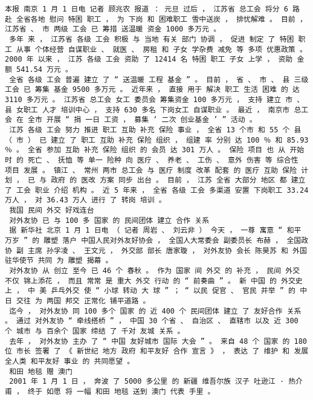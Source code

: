 \documentclass{article}
\begin{document}
\begin{Verbatim}[commandchars=\\\{\}]
 本报 南京 1 月 1 日电 记者 顾兆农 报道 ： 元旦 过后 ， 江苏省 总工会 将分 6 路 赴 全省各地 慰问 特困 职工 ， 为 下岗 和 困难职工 雪中送炭 ， 排忧解难 。 目前 ， 江苏省 、 市 两级 工会 已 筹措 送温暖 资金 1000 多万元 。 
 多年 来 ， 江苏省 各级 工会 积极 与 当地 有关 部门 协调 ， 促进 制定 了 特困 职工 从事 个体经营 自谋职业 、 就医 、 房租 和 子女 学杂费 减免 等 多项 优惠政策 。 2000 年 以来 ， 江苏 各级 工会 资助 了 12414 名 特困 职工 子女 上学 ， 资助 金额 541.54 万元 。 
 全省 各级 工会 普遍 建立 了 “ 送温暖 工程 基金 ” 。 目前 ， 省 、 市 、 县 三级 工会 已 筹集 基金 9500 多万元 。 近年来 ， 直接 用于 解决 职工 生活 困难 的 达 3110 多万元 。 江苏省 总工会 女工 委员会 筹集资金 100 多万元 ， 支持 建立 市 、 县 女职工 人才 培训中心 ， 支持 630 多名 下岗女工 自谋职业 。 最近 ， 南京市 总工会 在 全市 开展 “ 捐 一日 工资 ， 募集 ‘ 二次 创业基金 ’ ” 活动 。 
 江苏 各级 工会 努力 推进 职工 互助 补充 保险 事业 ， 全省 13 个市 和 55 个 县 （ 市 ） 已 建立 了 职工 互助 补充 保险 组织 ， 组建 率 分别 达 100 ％ 和 85.93 ％ 。 全省 参加 互助 补充 保险 组织 的 会员 达 301 万人 。 保险 项目 也 从 开始 时 的 死亡 、 抚恤 等 单一 险种 向 医疗 、 养老 、 工伤 、 意外 伤害 等 综合性 项目 发展 。 镇江 、 常州 两市 总工会 与 医疗 制度 改革 配套 的 医疗 互助 保险 计划 ， 已 与 政府 的 医改 方案 同步 出台 。 目前 ， 江苏 全省 大部分 地区 都 建立 了 工会 职业 介绍 机构 。 近 5 年来 ， 全省 各级 工会 多渠道 安置 下岗职工 33.24 万人 ， 对 36.43 万人 进行 了 转岗 培训 。 
 我国 民间 外交 好戏连台 
 对外友协 已 与 100 多 国家 的 民间团体 建立 合作 关系 
 据 新华社 北京 1 月 1 日电 （ 记者 周岩 、 刘云非 ） 今天 ， 一尊 寓意 “ 和平 万岁 ” 的 雕塑 落户 中国人民对外友好协会 ， 全国人大常委会 副委员长 布赫 ， 全国政协 副 主席 孙孚凌 、 王文元 ， 外交部 部长 唐家璇 ， 对外友协 会长 陈昊苏 和 外国 驻华使节 共同 为 雕塑 揭幕 。 
 对外友协 从 创立 至今 已 46 个 春秋 。 作为 国家 间 外交 的 补充 ， 民间 外交 不仅 锦上添花 ， 而且 常常 是 重大 外交 行动 的 “ 前奏曲 ” 。 新 中国 的 外交史 上 ， 中 美 乒乓外交 使 “ 小球 转动 大 球 ” ； “ 以民 促官 、 官民 并举 ” 的 中日 交往 为 两国 邦交 正常化 铺平道路 。 
 迄今 ， 对外友协 同 100 多个 国家 的 近 400 个 民间团体 建立 了 友好合作 关系 。 通过 对外友协 “ 牵线搭桥 ” ， 中国 30 个省 、 自治区 、 直辖市 以及 近 300 个 城市 与 百余个 国家 缔结 了 千对 友城 关系 。 
 去年 ， 对外友协 主办 了 “ 中国 友好城市 国际 大会 ” 。 来自 48 个 国家 的 180 位 市长 签署 了 《 新世纪 地方 政府 和平友好 合作 宣言 》 ， 表达 了 维护 和 发展 全人类 和平友好 事业 的 共同愿望 。 
 和田 地毯 赠 澳门 
 2001 年 1 月 1 日 ， 奔波 了 5000 多公里 的 新疆 维吾尔族 汉子 吐逊江 · 热介甫 ， 终于 如愿 将 一幅 和田 地毯 送到 澳门 代表 手里 。 

\end{Verbatim}
\end{document}
